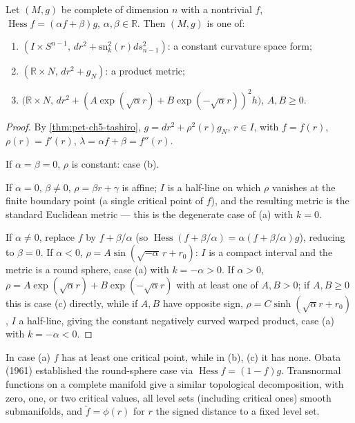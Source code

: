 \begin{theorem}[Thm. 5.7.5 — global classification for $\operatorname{Hess}f=(\alpha f+\beta)g$]
  \label{thm:pet-ch5-hessian-classification}
  Let $(M,g)$ be complete of dimension $n$ with a nontrivial $f$,
  $\operatorname{Hess}f=(\alpha f+\beta)g$, $\alpha,\beta\in\mathbb R$. Then
  $(M,g)$ is one of:
  \begin{enumerate}
  \item[(a)] $(I\times S^{n-1},\,dr^2+\mathrm{sn}_k^2(r)ds_{n-1}^2)$: a constant
  curvature space form;
  \item[(b)] $(\mathbb R\times N,\,dr^2+g_N)$: a product metric;
  \item[(c)] $\big(\mathbb R\times N,\,dr^2+(A\exp(\sqrt\alpha r)+B\exp(-\sqrt\alpha r))^2h\big)$,
  $A,B\ge0$.
  \end{enumerate}
\end{theorem}
\begin{proof}
  By \cref{thm:pet-ch5-tashiro}, $g=dr^2+\rho^2(r)g_N$, $r\in I$, with $f=f(r)$,
  $\rho(r)=f'(r)$, $\lambda=\alpha f+\beta=f''(r)$.

  If $\alpha=\beta=0$, $\rho$ is constant: case (b).

  If $\alpha=0$, $\beta\ne0$, $\rho=\beta r+\gamma$ is affine; $I$ is a half-line on
  which $\rho$ vanishes at the finite boundary point (a single critical point of
  $f$), and the resulting metric is the standard Euclidean metric — this is the
  degenerate case of (a) with $k=0$.

  If $\alpha\ne0$, replace $f$ by $f+\beta/\alpha$ (so
  $\operatorname{Hess}(f+\beta/\alpha)=\alpha(f+\beta/\alpha)g$), reducing to
  $\beta=0$. If $\alpha<0$, $\rho=A\sin(\sqrt{-\alpha}\,r+r_0)$: $I$ is a compact
  interval and the metric is a round sphere, case (a) with $k=-\alpha>0$. If
  $\alpha>0$, $\rho=A\exp(\sqrt\alpha r)+B\exp(-\sqrt\alpha r)$ with at least one of
  $A,B>0$; if $A,B\ge0$ this is case (c) directly, while if $A,B$ have opposite
  sign, $\rho=C\sinh(\sqrt\alpha r+r_0)$, $I$ a half-line, giving the constant
  negatively curved warped product, case (a) with $k=-\alpha<0$.
\end{proof}

\begin{remark}
  \label{rem:pet-ch5-obata-transnormal}
  In case (a) $f$ has at least one critical point, while in (b), (c) it has none.
  Obata (1961) established the round-sphere case via $\operatorname{Hess}f=(1-f)g$.
  Transnormal functions on a complete manifold give a similar topological
  decomposition, with zero, one, or two critical values, all level sets (including
  critical ones) smooth submanifolds, and $\tilde f=\phi(r)$ for $r$ the signed
  distance to a fixed level set.
\end{remark}

